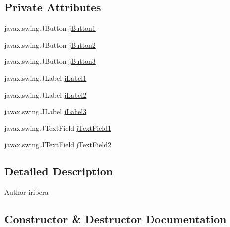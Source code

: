 \subsection*{Private Attributes}
\begin{DoxyCompactItemize}
\item 
javax.\+swing.\+J\+Button \mbox{\hyperlink{classactualizadordoxy_1_1ventana_principal_a9e234f123e4d11dcd43f19051065a6bd}{j\+Button1}}
\item 
javax.\+swing.\+J\+Button \mbox{\hyperlink{classactualizadordoxy_1_1ventana_principal_a2cf13d88ffb8e10bbc41bf5d690bd6fe}{j\+Button2}}
\item 
javax.\+swing.\+J\+Button \mbox{\hyperlink{classactualizadordoxy_1_1ventana_principal_a228eef1536949c06fd4cfef1fe9b97b8}{j\+Button3}}
\item 
javax.\+swing.\+J\+Label \mbox{\hyperlink{classactualizadordoxy_1_1ventana_principal_aa119cc780acbfdd1f1dc1fa1899136f4}{j\+Label1}}
\item 
javax.\+swing.\+J\+Label \mbox{\hyperlink{classactualizadordoxy_1_1ventana_principal_af6f45a2a5f32cdee4845fcd9e66f16c8}{j\+Label2}}
\item 
javax.\+swing.\+J\+Label \mbox{\hyperlink{classactualizadordoxy_1_1ventana_principal_a7581b585f39de6258b08299571546229}{j\+Label3}}
\item 
javax.\+swing.\+J\+Text\+Field \mbox{\hyperlink{classactualizadordoxy_1_1ventana_principal_a0e2df794c32f58c41675cd579e38b5d0}{j\+Text\+Field1}}
\item 
javax.\+swing.\+J\+Text\+Field \mbox{\hyperlink{classactualizadordoxy_1_1ventana_principal_a8e245eb8ef04c878fffa2f029094c142}{j\+Text\+Field2}}
\end{DoxyCompactItemize}


\subsection{Detailed Description}
\begin{DoxyAuthor}{Author}
iribera 
\end{DoxyAuthor}


\subsection{Constructor \& Destructor Documentation}
\mbox{\label{classactualizadordoxy_1_1ventana_principal_a6964b4afb82d10ecc070ac305c8e5dd4}} 
